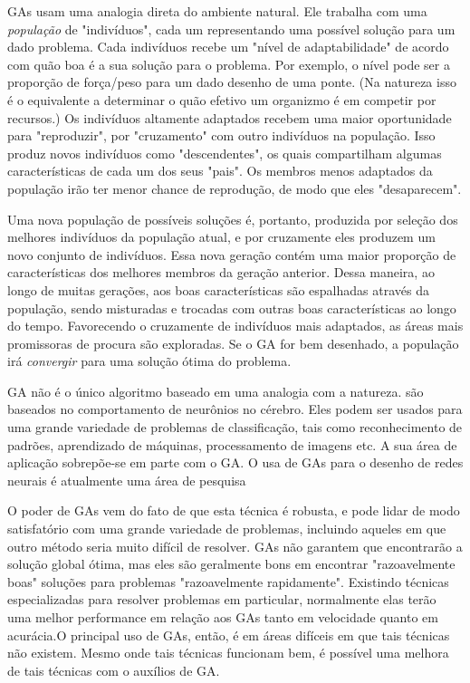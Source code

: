 GAs usam uma analogia direta do ambiente natural. Ele trabalha com uma \textit{população} de "indivíduos", cada um representando uma possível solução para um dado problema. Cada indivíduos recebe um "nível de adaptabilidade" de acordo com quão boa é a sua solução para o problema. Por exemplo, o nível pode ser a proporção de força/peso para um dado desenho de uma ponte. (Na natureza isso é o equivalente a determinar o quão efetivo um organizmo é em competir por recursos.) Os indivíduos altamente adaptados recebem uma maior oportunidade para "reproduzir", por "cruzamento" com outro indivíduos na população. Isso produz novos indivíduos como "descendentes", os quais compartilham algumas características de cada um dos seus "pais". Os membros menos adaptados da população irão ter menor chance de reprodução, de modo que eles "desaparecem".

Uma nova população de possíveis soluções é, portanto, produzida por seleção dos melhores indivíduos da população atual, e por cruzamente eles produzem um novo conjunto de indivíduos. Essa nova geração contém uma maior proporção de características dos melhores membros da geração anterior. Dessa maneira, ao longo de muitas gerações, aos boas características são espalhadas através da população, sendo misturadas e trocadas com outras boas características ao longo do tempo. Favorecendo o cruzamente de indivíduos mais adaptados, as áreas mais promissoras de procura são exploradas. Se o GA for bem desenhado, a população irá \textit{convergir} para uma solução ótima do problema.

GA não é o único algoritmo baseado em uma analogia com a natureza.  são baseados no comportamento de neurônios no cérebro. Eles podem ser usados para uma grande variedade de problemas de classificação, tais como reconhecimento de padrões, aprendizado de máquinas, processamento de imagens etc. A sua área de aplicação sobrepõe-se em parte com o GA. O usa de GAs para o desenho de redes neurais é atualmente uma área de pesquisa \cite{harp1991genetic}

O poder de GAs vem do fato de que esta técnica é robusta, e pode lidar de modo satisfatório com uma grande variedade de problemas, incluindo aqueles em que outro método seria muito difícil de resolver. GAs não garantem que encontrarão a solução global ótima, mas eles são geralmente bons em encontrar "razoavelmente boas" soluções para problemas "razoavelmente rapidamente". Existindo técnicas especializadas para resolver problemas em particular, normalmente elas terão uma melhor performance em relação aos GAs tanto em velocidade quanto em acurácia.O principal uso de GAs, então, é em áreas difíceis em que tais técnicas não existem. Mesmo onde tais técnicas funcionam bem, é possível uma melhora de tais técnicas com o auxílios de GA.

